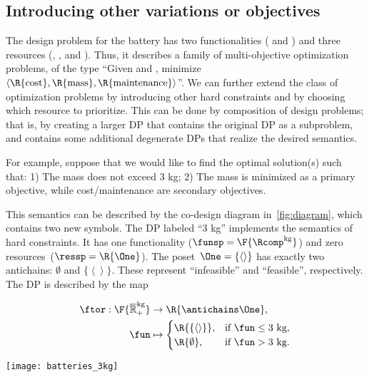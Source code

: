 \subsection{Introducing other variations or objectives}

The design problem for the battery has two functionalities (
and ) and three resources (, ,
and ). Thus, it describes a family of multi-objective
optimization problems, of the type ``Given  and ,
minimize $\left\langle \R{\text{cost}},\R{\text{mass}},\R{\text{maintenance}}\right\rangle $''.
We can further extend the class of optimization problems by introducing
other hard constraints and by choosing which resource to prioritize.
This can be done by composition of design problems; that is, by creating
a larger DP that contains the original DP as a subproblem, and contains
some additional degenerate DPs that realize the desired semantics.

For example, suppose that we would like to find the optimal solution(s)
such that: 1) The mass does not exceed 3 kg; 2) The mass is minimized
as a primary objective, while cost/maintenance are secondary objectives.

This semantics can be described by the co-design diagram in~\cref{fig:diagram},
which contains two new symbols. The DP labeled ``3 kg'' implements
the semantics of hard constraints. It has one functionality ($\funsp=\F{\Rcomp^{\text{kg}}}$)
and zero resources~($\ressp=\R{\One}$). The poset~$\One=\{\left\langle \right\rangle \}$
has exactly two antichains: $\emptyset$ and $\{\left\langle \right\rangle \}$.
These represent ``infeasible'' and ``feasible'', respectively.
The DP is described by the map

\quad\quad
\begin{minipage}[c]{5cm}
    \begin{align*}
        \ftor:\F{\mathbb{\overline{R}}_{+}^{\text{kg}}} & \rightarrow\R{\antichains\One},\\
        \fun& \mapsto\begin{cases}
                         \R{\{\left\langle \right\rangle \}}, & \text{if }\fun\leq\text{3 kg},\\
                         \R{\emptyset}, & \text{if }\fun>\text{3 kg}.
        \end{cases}
    \end{align*}

\end{minipage}\quad\texttt{[image: batteries\_3kg]}

